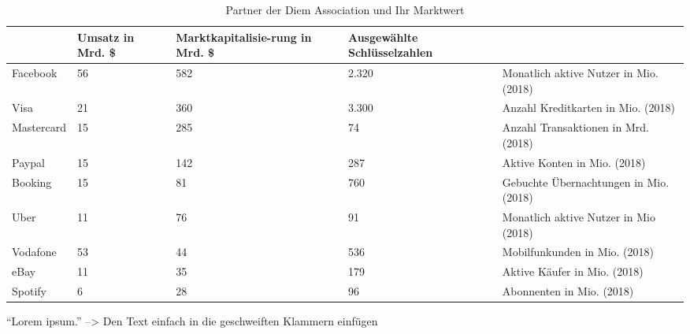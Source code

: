 \begin{table}[H]
    \centering
    {\footnotesize
        \begin{tabularx}{\textwidth}{|l|p{}|p{}|p{}|X|}
            \hline
                       & Umsatz in Mrd. \$ & Marktkapitalisie-rung in Mrd. \$ & Ausgewählte Schlüsselzahlen &                                        \\
            \hline
            Facebook   & 56                & 582                              & 2.320                       & Monatlich aktive Nutzer in Mio. (2018) \\
            \hline
            Visa       & 21                & 360                              & 3.300                       & Anzahl Kreditkarten in Mio. (2018)     \\
            \hline
            Mastercard & 15                & 285                              & 74                          & Anzahl Transaktionen in Mrd. (2018)    \\
            \hline
            Paypal     & 15                & 142                              & 287                         & Aktive Konten in Mio. (2018)           \\
            \hline
            Booking    & 15                & 81                               & 760                         & Gebuchte Übernachtungen in Mio. (2018) \\
            \hline
            Uber       & 11                & 76                               & 91                          & Monatlich aktive Nutzer in Mio (2018)  \\
            \hline
            Vodafone   & 53                & 44                               & 536                         & Mobilfunkunden in Mio. (2018)          \\
            \hline
            eBay       & 11                & 35                               & 179                         & Aktive Käufer in Mio. (2018)           \\
            \hline
            Spotify    & 6                 & 28                               & 96                          & Abonnenten in Mio. (2018)              \\
            \hline
        \end{tabularx}
    }
    \caption{Partner der Diem Association und Ihr Marktwert \cite{libra.das.globale.finanzsystem}}
    \label{tab:uebersicht_zusammensetzung}
\end{table}

\textcite[eg.][\psq]{} %
\parencite[eg.][\psqq]{} %

\cite[eg.][\psq]{} %
\textcite[eg.][\psqq]{} %

\enquote{Lorem ipsum.} --> Den Text einfach in die geschweiften Klammern einfügen
